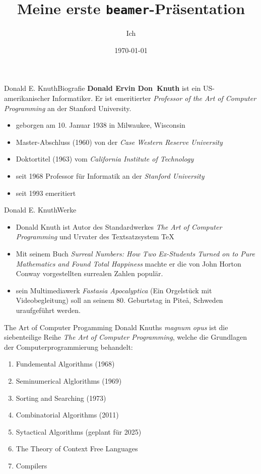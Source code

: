 \documentclass[aspectratio=32]{beamer}
\title{Meine erste \texttt{beamer}-Präsentation}
\author{Ich}
\institute{Friedrich-Schiller-Universität Jena}
\date{\today}
\begin{document}
\begin{frame} \titlepage \end{frame}


\begin{frame}{Donald E. Knuth}{Biografie}
	\textbf{Donald Ervin \glqq Don\grqq\ Knuth} ist ein US-amerikanischer Informatiker. Er ist emeritierter \textit{Professor of the Art of Computer Programming} an der Stanford University.
	
\begin{itemize}
	\item geborgen am 10. Januar 1938 in Milwaukee, Wisconsin
	\item Master-Abschluss (1960) von der \textit{Case Western Reserve University}
	\item Doktortitel (1963) vom \textit{California Institute of Technology} 
	\item seit 1968 Professor für Informatik an der \textit{Stanford University}
	\item seit 1993 emeritiert
	
\end{itemize}
	
	
\end{frame}

\begin{frame}{Donald E. Knuth}{Werke}
	\begin{itemize}
		\item Donald Knuth ist Autor des Standardwerkes \textit{The Art of Computer Programming} und Urvater des Textsatzsystem \TeX 
		\item Mit seinem Buch \textit{Surreal Numbers: How Two Ex-Students Turned on to Pure Mathematics and Found Total Happiness} machte er die von John Horton Conway vorgestellten surrealen Zahlen populär.
		\item sein Multimediawerk \textit{Fastasia Apocalyptica} (Ein Orgelstück mit Videobegleitung) soll an seinem 80. Geburtstag in Pite\aa, Schweden uraufgeführt werden.
	\end{itemize}
\end{frame}

\begin{frame}{The Art of Computer Progamming}
	Donald Knuths \textit{magnum opus} ist die siebenteilige Reihe \textit{The Art of Computer Programming}, welche die Grundlagen der Computerprogrammierung behandelt:
	\begin{enumerate}
		\item Fundemental Algorithms (1968)
		\item Seminumerical Alglorithms (1969)
		\item Sorting and Searching (1973)
		\item Combinatorial Algorithms (2011)
		\item Sytactical Algorithms (geplant für 2025)
		\item The Theory of Context Free Languages
		\item Compilers
		
	\end{enumerate}
\end{frame}
\end{document}
